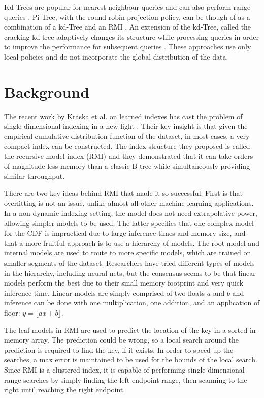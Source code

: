\documentclass[sigconf,10pt]{acmart}
\begin{document}
Kd-Trees are popular for nearest neighbour queries 
and can also perform range queries \cite{kd-Tree,ModernMDRQ}.
Pi-Tree, with the round-robin projection policy, can be though of as a combination
of a kd-Tree and an RMI \cite{Learned_Index}. 
An extension of the kd-Tree, called the cracking kd-tree adaptively
changes its structure while processing queries in order to improve 
the performance for subsequent queries \cite{CrackingKD-Tree}.
These approaches use only local policies and do not incorporate the global distribution
of the data.


\section{Background}

The recent work by Kraska et al. on learned indexes
has cast the problem of single dimensional indexing in a new light \cite{Learned_Index}.
Their key insight is that given the empirical cumulative distribution function
of the dataset, in most cases, a very compact index can be constructed. 
The index structure they proposed is called the recursive model index (RMI) and they
demonstrated that it can take orders of magnitude less memory
than a classic B-tree while simultaneously providing similar throughput.

There are two key ideas behind RMI that made it so successful.
First is that overfitting is not an issue, unlike almost all other machine learning 
applications. In a non-dynamic indexing setting, the model does not need extrapolative
power, allowing simpler models to be used.
The latter specifies that one complex model for the CDF is impractical due to large inference times
and memory size, and that a more fruitful approach is to 
use a hierarchy of models. The root model and internal models are used to route
to more specific models, which are trained on smaller segments of the dataset. 
Researchers have tried different types of models in the hierarchy, including neural nets,
but the consensus seems to be that linear models perform the best due
to their small memory footprint and very quick inference time. %
Linear models are simply comprised of two floats $a$ and $b$ and inference
can be done with one multiplication, one addition, and an application of floor:
$y = \lfloor ax + b \rfloor$.

The leaf models in RMI are used to predict the location of the key in a sorted 
in-memory array. The prediction could be wrong, so a local search around the prediction
is required to find the key, if it exists. In order to speed up the searches,
a max error is maintained to be used for the bounds of the local search.
Since RMI is a clustered index, it is capable of performing single dimensional range searches
by simply finding the left endpoint range, then scanning to the right until reaching the right
endpoint.
\end{document}
